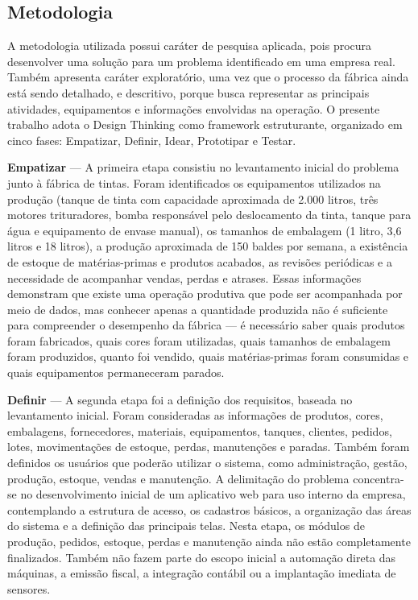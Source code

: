 \documentclass[12pt,a4paper]{article}
\begin{document}
\subsection{Metodologia}
A metodologia utilizada possui caráter de pesquisa aplicada, pois procura desenvolver uma solução para um problema identificado em uma empresa real. Também apresenta caráter exploratório, uma vez que o processo da fábrica ainda está sendo detalhado, e descritivo, porque busca representar as principais atividades, equipamentos e informações envolvidas na operação. O presente trabalho adota o Design Thinking como framework estruturante, organizado em cinco fases: Empatizar, Definir, Idear, Prototipar e Testar.

\textbf{Empatizar} — A primeira etapa consistiu no levantamento inicial do problema junto à fábrica de tintas. Foram identificados os equipamentos utilizados na produção (tanque de tinta com capacidade aproximada de 2.000 litros, três motores trituradores, bomba responsável pelo deslocamento da tinta, tanque para água e equipamento de envase manual), os tamanhos de embalagem (1 litro, 3,6 litros e 18 litros), a produção aproximada de 150 baldes por semana, a existência de estoque de matérias-primas e produtos acabados, as revisões periódicas e a necessidade de acompanhar vendas, perdas e atrases. Essas informações demonstram que existe uma operação produtiva que pode ser acompanhada por meio de dados, mas conhecer apenas a quantidade produzida não é suficiente para compreender o desempenho da fábrica — é necessário saber quais produtos foram fabricados, quais cores foram utilizadas, quais tamanhos de embalagem foram produzidos, quanto foi vendido, quais matérias-primas foram consumidas e quais equipamentos permaneceram parados.

\textbf{Definir} — A segunda etapa foi a definição dos requisitos, baseada no levantamento inicial. Foram consideradas as informações de produtos, cores, embalagens, fornecedores, materiais, equipamentos, tanques, clientes, pedidos, lotes, movimentações de estoque, perdas, manutenções e paradas. Também foram definidos os usuários que poderão utilizar o sistema, como administração, gestão, produção, estoque, vendas e manutenção. A delimitação do problema concentra-se no desenvolvimento inicial de um aplicativo web para uso interno da empresa, contemplando a estrutura de acesso, os cadastros básicos, a organização das áreas do sistema e a definição das principais telas. Nesta etapa, os módulos de produção, pedidos, estoque, perdas e manutenção ainda não estão completamente finalizados. Também não fazem parte do escopo inicial a automação direta das máquinas, a emissão fiscal, a integração contábil ou a implantação imediata de sensores.
\end{document}
